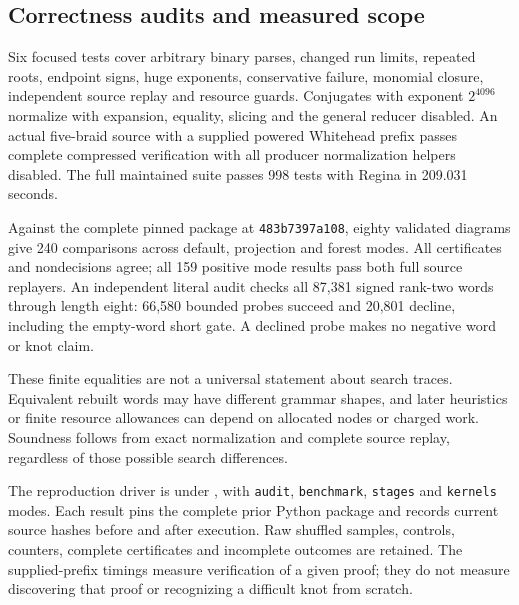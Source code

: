 \subsection{Correctness audits and measured scope}

Six focused tests cover arbitrary binary parses, changed run limits,
repeated roots, endpoint signs, huge exponents, conservative failure,
monomial closure, independent source replay and resource guards. Conjugates
with exponent $2^{4096}$ normalize with expansion, equality, slicing and
the general reducer disabled. An actual five-braid source with a supplied
powered Whitehead prefix passes complete compressed verification with
all producer normalization helpers disabled. The full maintained suite
passes 998 tests with Regina in 209.031 seconds.

Against the complete pinned package at \texttt{483b7397a108}, eighty
validated diagrams give 240 comparisons across default, projection and
forest modes. All certificates and nondecisions agree; all 159 positive
mode results pass both full source replayers. An independent literal audit
checks all 87,381 signed rank-two words through length eight: 66,580 bounded
probes succeed and 20,801 decline, including the empty-word short gate.
A declined probe makes no negative word or knot claim.

These finite equalities are not a universal statement about search traces.
Equivalent rebuilt words may have different grammar shapes, and later
heuristics or finite resource allowances can depend on allocated nodes
or charged work. Soundness follows from exact normalization and complete
source replay, regardless of those possible search differences.



The reproduction driver is 
under , with \texttt{audit}, \texttt{benchmark},
\texttt{stages} and \texttt{kernels} modes. Each result pins the complete
prior Python package and records current source hashes before and after
execution. Raw shuffled samples, controls, counters, complete certificates
and incomplete outcomes are retained. The supplied-prefix timings measure
verification of a given proof; they do not measure discovering that proof
or recognizing a difficult knot from scratch.


